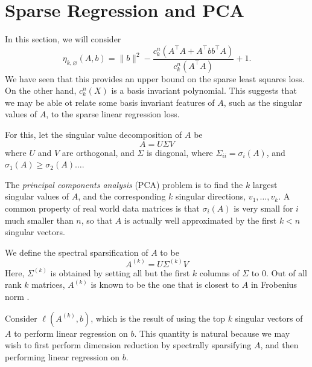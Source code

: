 \documentclass{amsart}
\theoremstyle{definition}
\numberwithin{equation}{section}
\begin{document}
\section{Sparse Regression and PCA}
In this section, we will consider 
\[
    \eta_{k, \varnothing}(A, b) = \|b\|^2 - \frac{c_k^n(A^{\intercal}A + A^{\intercal}bb^{\intercal}A)}{c_k^n(A^{\intercal}A)} + 1.
\]
We have seen that this provides an upper bound on the sparse least squares loss.
On the other hand, $c_k^n(X)$ is a basis invariant polynomial.
This suggests that we may be able ot relate some basis invariant features of $A$, such as the singular values of $A$, to the sparse linear regression loss.

For this, let the singular value decomposition of $A$ be 
\[
    A = U\Sigma V
\]
where $U$ and $V$ are orthogonal, and $\Sigma$ is diagonal, where $\Sigma_{ii}  = \sigma_i(A)$, and $\sigma_1(A) \ge \sigma_2(A) \dots $.

The \emph{principal components analysis} (PCA) problem is to find the $k$ largest singular values of $A$, and the corresponding $k$ singular directions, $v_1, \dots, v_k$.
A common property of real world data matrices is that $\sigma_i(A)$ is very small for $i$ much smaller than $n$, so that $A$ is actually well approximated by the first $k < n$ singular vectors.

We define the spectral sparsification of $A$ to be 
\[
    A^{(k)} = U\Sigma^{(k)}V
\]
Here, $\Sigma^{(k)}$ is obtained by setting all but the first $k$ columns of $\Sigma$ to 0.
Out of all rank $k$ matrices, $A^{(k)}$ is known to be the one that is closest to $A$ in Frobenius norm \cite{TODO}.

Consider $\ell(A^{(k)}, b)$, which is the result of using the top $k$ singular vectors of $A$ to perform linear regression on $b$.
This quantity is natural because we may wish to first perform dimension reduction by spectrally sparsifying $A$, and then performing linear regression on $b$.
\end{document}
